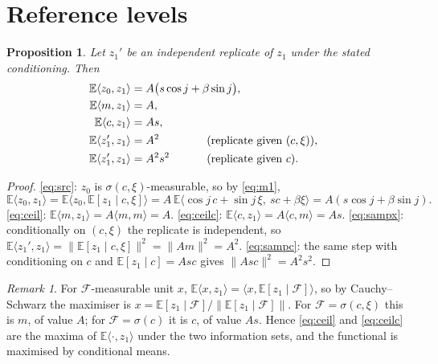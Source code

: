 \documentclass[11pt]{article}
\newtheorem{proposition}[lemma]{Proposition}
\theoremstyle{definition}
\theoremstyle{remark}
\newtheorem{remark}[lemma]{Remark}
\newcommand{\E}{\mathbb{E}}
\begin{document}
\section{Reference levels}\label{sec:ref}

\begin{proposition}\label{prop:ref}
Let $z_1'$ be an independent replicate of $z_1$ under the stated conditioning. Then
\begin{align}
\E\langle z_0,z_1\rangle &= A\big(s\cos j+\beta\sin j\big), \label{eq:src}\\
\E\langle m,z_1\rangle &= A, \label{eq:ceil}\\
\E\langle c,z_1\rangle &= As, \label{eq:ceilc}\\
\E\langle z_1',z_1\rangle &= A^{2} &&\hspace{-4em}\text{(replicate given }(c,\xi)), \label{eq:sampx}\\
\E\langle z_1',z_1\rangle &= A^{2}s^{2} &&\hspace{-4em}\text{(replicate given }c). \label{eq:sampc}
\end{align}
\end{proposition}

\begin{proof}
\eqref{eq:src}: $z_0$ is $\sigma(c,\xi)$-measurable, so by \eqref{eq:m1},
\[
\E\langle z_0,z_1\rangle=\E\big\langle z_0,\E[z_1\mid c,\xi]\big\rangle
=A\,\E\langle\cos j\,c+\sin j\,\xi,\ sc+\beta\xi\rangle=A(s\cos j+\beta\sin j).
\]
\eqref{eq:ceil}: $\E\langle m,z_1\rangle=A\langle m,m\rangle=A$.
\eqref{eq:ceilc}: $\E\langle c,z_1\rangle=A\langle c,m\rangle=As$.
\eqref{eq:sampx}: conditionally on $(c,\xi)$ the replicate is independent, so
$\E\langle z_1',z_1\rangle=\|\E[z_1\mid c,\xi]\|^{2}=\|Am\|^{2}=A^{2}$.
\eqref{eq:sampc}: the same step with conditioning on $c$ and $\E[z_1\mid c]=Asc$ gives
$\|Asc\|^{2}=A^{2}s^{2}$.
\end{proof}

\begin{remark}\label{rem:whichopt}
For $\mathcal F$-measurable unit $x$, $\E\langle x,z_1\rangle=\langle x,\E[z_1\mid\mathcal F]\rangle$,
so by Cauchy--Schwarz the maximiser is $x=\E[z_1\mid\mathcal F]/\|\E[z_1\mid\mathcal F]\|$. For
$\mathcal F=\sigma(c,\xi)$ this is $m$, of value $A$; for $\mathcal F=\sigma(c)$ it is $c$, of value
$As$. Hence \eqref{eq:ceil} and \eqref{eq:ceilc} are the maxima of $\E\langle\cdot,z_1\rangle$
under the two information sets, and the functional is maximised by conditional means.
\end{remark}
\end{document}
